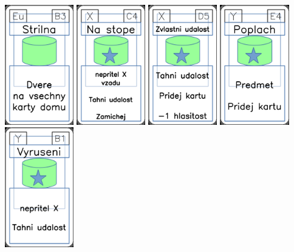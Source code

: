 \documentclass[a4paper]{article}
\begin{document}
	\includegraphics[width=3.0cm]{img-4_37}
	\includegraphics[width=3.0cm]{img-5_13}
	\includegraphics[width=3.0cm]{img-5_19}
	\includegraphics[width=3.0cm]{img-5_23}
	\includegraphics[width=3.0cm]{img-5_35}
\end{document}

